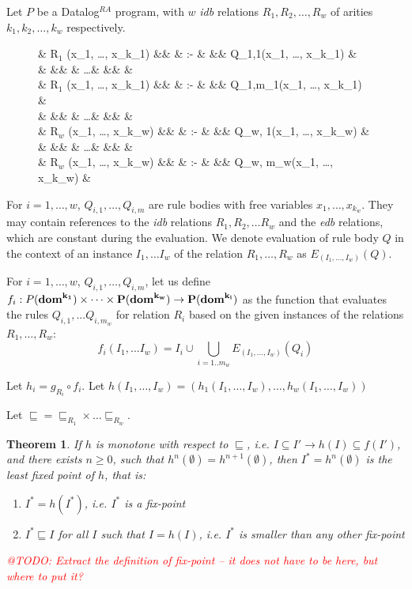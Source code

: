 \documentclass{pracamgr}
\makeatletter
\theoremstyle{plain}
\newtheorem{thm}{Theorem}[section]
\theoremstyle{definition}
\theoremstyle{remark}
\newcommand{\todo}[1]{\textcolor{red}{@TODO: #1}}
\newcommand{\datalogra}{Datalog$^{RA}$ }
\newcommand{\narrow}[1]{\begin{changemargin}{2cm}{2cm} #1 \end{changemargin}}
\makeatother
\begin{document}
Let $P$ be a \datalogra program, with $w$ \emph{idb} relations $R_1, R_2, \dots, R_w$ of arities $k_1, k_2, \dots, k_w$ respectively.

\begin{figure}[h!]
\narrow{
  \begin{flalign*}
  & \textsc{R$_1$} (x_1, \dots, x_{k_1}) &&  & :- & && Q_{1,1}(x_1, \dots, x_{k_1}) & \\
  &  &&  & \dots & && & \\
  & \textsc{R$_1$} (x_1, \dots, x_{k_1}) &&  & :- & && Q_{1,{m_1}}(x_1, \dots, x_{k_1}) & \\
  &  &&  & \dots & && & \\
  & \textsc{R$_w$} (x_1, \dots, x_{k_w}) &&  & :- & && Q_{w, 1}(x_1, \dots, x_{k_w}) & \\
  &  &&  & \dots & && & \\
  & \textsc{R$_w$} (x_1, \dots, x_{k_w}) &&  & :- & && Q_{w, {m_w}}(x_1, \dots, x_{k_w}) & \\
  \end{flalign*}
}
\end{figure}

For $i = 1, \dots, w$, $Q_{i,1}, \dots, Q_{i,m}$ are rule bodies with free variables $x_1, \dots, x_{k_w}$. They may contain references to the \emph{idb} relations $R_1, R_2, \dots R_w$ and the \emph{edb} relations, which are constant during the evaluation. We denote evaluation of rule body $Q$ in the context of an instance $I_1, \dots I_w$ of the relation $R_1, \dots, R_w$ as $E_(I_1, \dots, I_w)(Q)$.

For $i = 1, \dots, w$, $Q_{i,1}, \dots, Q_{i,m}$, let us define $f_i: P(\bf{dom}^{k_1}) \times \dots \times P(\bf{dom}^{k_w}) \to P(\bf{dom}^{k_i})$ as the function that evaluates the rules $Q_{i,1}, ... Q_{i, m_w}$ for relation $R_i$ based on the given instances of the relations $R_1, \dots, R_w$:
$$ f_i(I_1, \dots I_w) = I_i \cup \bigcup_{i=1..{m_w}} E_(I_1, \dots, I_w)(Q_i) $$

Let $h_i = g_{R_i} \circ f_i$. Let $h(I_1, \dots, I_w) = (h_1(I_1, \dots, I_w), \dots, h_w(I_1, \dots, I_w))$

Let $\sqsubseteq = \sqsubseteq_{R_1} \times \dots \sqsubseteq_{R_w}$.

\begin{thm}
If $h$ is monotone with respect to $\sqsubseteq$, i.e. $I \subseteq I' \rightarrow h(I) \subseteq f(I')$, and there exists $n \ge 0 $, such that $h^n(\emptyset) = h^{n+1}(\emptyset)$, then $I^* = h^n(\emptyset)$ is the least fixed point of $h$, that is:
\begin{enumerate}
\item $I^* = h(I^*)$, i.e. $I^*$ is a fix-point
\item $I^* \sqsubseteq I$ for all $I$ such that $I = h(I)$, i.e. $I^*$ is smaller than any other fix-point
\end{enumerate}
\todo{Extract the definition of fix-point -- it does not have to be here, but where to put it?}
\end{thm}
\end{document}
